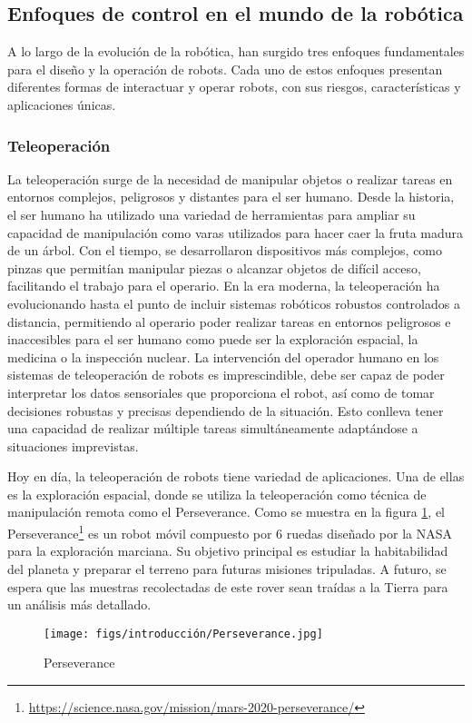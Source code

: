  \subsection{Enfoques de control en el mundo de la robótica}
 \label{sec:enfoquesrobotica}
A lo largo de la evolución de la robótica, han surgido tres enfoques fundamentales para el diseño y la operación de robots. Cada uno de estos enfoques presentan diferentes
formas de interactuar y operar robots, con sus riesgos, características y aplicaciones únicas. 
\subsubsection{Teleoperación}
\label{sec:subseccion}

La teleoperación surge de la necesidad de manipular objetos o realizar tareas en entornos complejos, peligrosos y distantes para el ser humano. Desde la historia, el ser humano
ha utilizado una variedad de herramientas para ampliar su capacidad de manipulación como varas utilizados para hacer caer la fruta madura de un árbol. Con el tiempo, se desarrollaron 
dispositivos más complejos, como pinzas que permitían manipular piezas o alcanzar objetos de difícil acceso, facilitando el trabajo para el operario. En la era moderna, la teleoperación
ha evolucionando hasta el punto de incluir sistemas robóticos robustos controlados a distancia, permitiendo al operario poder realizar
tareas en entornos peligrosos e inaccesibles para el ser humano como puede ser la exploración espacial, la medicina o la inspección nuclear.
La intervención del operador humano en los sistemas de teleoperación de robots es imprescindible, debe ser capaz de poder interpretar los datos sensoriales que proporciona el robot, así como de 
tomar decisiones robustas y precisas dependiendo de la situación. Esto conlleva tener una capacidad de realizar múltiple tareas simultáneamente adaptándose a situaciones imprevistas.

Hoy en día, la teleoperación de robots tiene variedad de aplicaciones. Una de ellas es la exploración espacial, donde se utiliza la teleoperación
como técnica de manipulación remota como el Perseverance. Como se muestra en la figura \ref{fig:Perseverance}, el Perseverance\footnote{\url{https://science.nasa.gov/mission/mars-2020-perseverance/}} 
es un robot móvil compuesto por 6 ruedas diseñado por la NASA para la exploración marciana. Su objetivo principal es estudiar la habitabilidad del planeta y preparar el terreno para futuras misiones 
tripuladas. A futuro, se espera que las muestras recolectadas de este rover sean traídas a la Tierra para un análisis más detallado.
\begin{figure} [H]
  \begin{center}
    \texttt{[image: figs/introducción/Perseverance.jpg]}
  \end{center}
  \caption{Perseverance}
  \label{fig:Perseverance}
  \vspace{-1.5em}
\end{figure}

